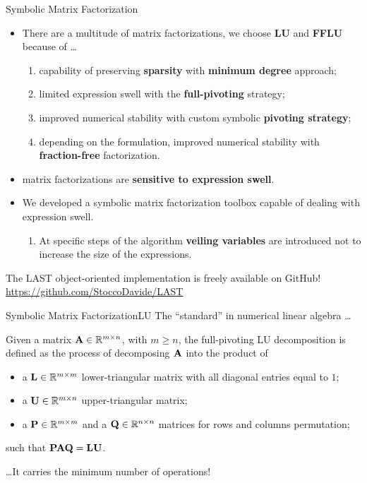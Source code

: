 \begin{frame}{Symbolic Matrix Factorization}
  \begin{itemize}
    \item There are a multitude of matrix factorizations, we choose \textbf{\ac{LU}} and \textbf{\ac{FFLU}} because of \dots
    \begin{enumerate}
      \item capability of preserving \textbf{sparsity} with \textbf{minimum degree} approach;
      \item limited expression swell with the \textbf{full-pivoting} strategy;
      \item improved numerical stability with custom symbolic \textbf{pivoting strategy};
      \item depending on the formulation, improved numerical stability with \textbf{fraction-free} factorization.
    \end{enumerate}
    \item \Maple{} matrix factorizations are \textbf{sensitive to expression swell}.
    \item We developed a symbolic matrix factorization toolbox capable of dealing with expression swell.
    \begin{enumerate}
      \item At specific steps of the algorithm \textbf{veiling variables} are introduced not to increase the size of the expressions.
    \end{enumerate}
\end{itemize}
  \begin{bbox}
  The LAST object-oriented implementation is freely available on GitHub! \\
  \centering \url{https://github.com/StoccoDavide/LAST}
\end{bbox}
\end{frame}

\begin{frame}{Symbolic Matrix Factorization}{\acf{LU}}
  The ``standard'' in numerical linear algebra \dots
  \begin{bbox}
    Given a matrix $\mathbf{A} \in \mathbb{R}^{m \times n}$, with $m \geq n$, the full-pivoting \ac{LU} decomposition is defined as the process of decomposing $\mathbf{A}$ into the product of
    \begin{itemize}
      \item a $\mathbf{L} \in \mathbb{R}^{m \times m}$ lower-triangular matrix with all diagonal entries equal to $1$;
      \item a $\mathbf{U} \in \mathbb{R}^{m \times n}$ upper-triangular matrix;
      \item a $\mathbf{P} \in \mathbb{R}^{m \times m}$ and a $\mathbf{Q} \in \mathbb{R}^{n \times n}$ matrices for rows and columns permutation;
    \end{itemize}
    such that $\mathbf{P}\mathbf{A}\mathbf{Q} = \mathbf{L}\mathbf{U}$.
  \end{bbox}
  \dots It carries the minimum number of operations!
\end{frame}

